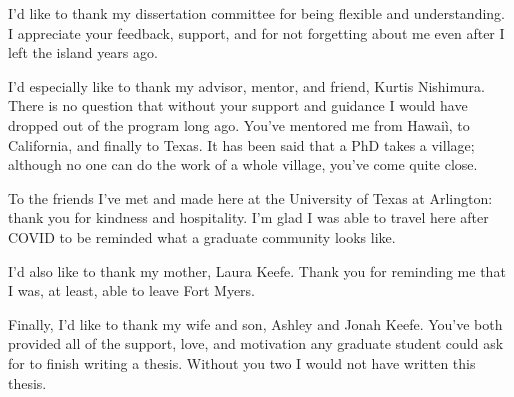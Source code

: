 \documentclass[12pt]{uh_thesis}
\begin{document}
\begin{acknowledgements}

    I'd like to thank my dissertation committee for being flexible and understanding.
    I appreciate your feedback, support, and for not forgetting about me even after I left the island years ago.

    I'd especially like to thank my advisor, mentor, and friend, Kurtis Nishimura.
    There is no question that without your support and guidance I would have dropped out of the program long ago.
    You've mentored me from Hawai\`i, to California, and finally to Texas.
    It has been said that a PhD takes a village; although no one can do the work of a whole village, you've come quite close. 

    To the friends I've met and made here at the University of Texas at Arlington: thank you for kindness and hospitality.
    I'm glad I was able to travel here after COVID to be reminded what a graduate community looks like.

    I'd also like to thank my mother, Laura Keefe.
    Thank you for reminding me that I was, at least, able to leave Fort Myers.

    Finally, I'd like to thank my wife and son, Ashley and Jonah Keefe.
    You've both provided all of the support, love, and motivation any graduate student could ask for to finish writing a thesis.
    Without you two I would not have written this thesis.

\end{acknowledgements}
\end{document}
